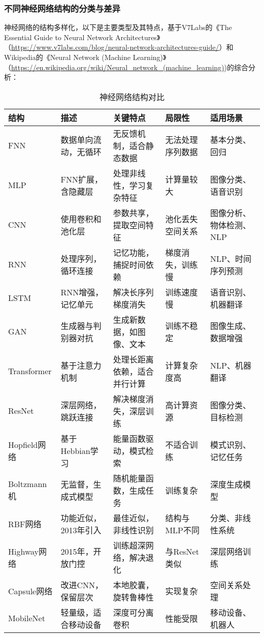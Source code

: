 \documentclass[UTF8]{report}
\theoremstyle{MyLineTheoremStyle} %
\theoremstyle{MyBlockTheoremStyle} %
\theoremstyle{MySubsubsectionStyle} %
\begin{document}
\subsubsection{不同神经网络结构的分类与差异}
神经网络的结构多样化，以下是主要类型及其特点，基于V7Labs的《The Essential Guide to Neural Network Architectures》（\url{https://www.v7labs.com/blog/neural-network-architectures-guide/}）和Wikipedia的《Neural Network (Machine Learning)》（\url{https://en.wikipedia.org/wiki/Neural_network_(machine_learning)})的综合分析：

\begin{table}[h]
\centering
\caption{神经网络结构对比}
\begin{tabular}{l p{3.5cm} p{4cm} p{3cm} p{3cm}}
\toprule
\textbf{结构} & \textbf{描述} & \textbf{关键特点} & \textbf{局限性} & \textbf{适用场景} \\
\midrule
FNN & 数据单向流动，无循环 & 无反馈机制，适合静态数据 & 无法处理序列数据 & 基本分类、回归 \\
MLP & FNN扩展，含隐藏层 & 处理非线性，学习复杂特征 & 计算量较大 & 图像分类、语音识别 \\
CNN & 使用卷积和池化层 & 参数共享，提取空间特征 & 池化丢失空间关系 & 图像分析、物体检测、NLP \\
RNN & 处理序列，循环连接 & 记忆功能，捕捉时间依赖 & 梯度消失，训练慢 & NLP、时间序列预测 \\
LSTM & RNN增强，记忆单元 & 解决长序列梯度消失 & 训练速度慢 & 语音识别、机器翻译 \\
GAN & 生成器与判别器对抗 & 生成新数据，如图像、文本 & 训练不稳定 & 图像生成、数据增强 \\
Transformer & 基于注意力机制 & 处理长距离依赖，适合并行计算 & 计算复杂度高 & NLP、机器翻译 \\
ResNet & 深层网络，跳跃连接 & 解决梯度消失，深层训练 & 高计算资源 & 图像分类、目标检测 \\
Hopfield网络 & 基于Hebbian学习 & 能量函数驱动，模式检索 & 不适合训练 & 模式识别、记忆任务 \\
Boltzmann机 & 无监督，生成式模型 & 随机能量函数，生成任务 & 训练复杂 & 深度生成模型 \\
RBF网络 & 功能近似，2013年引入 & 最佳近似，非线性识别 & 结构与MLP不同 & 分类、非线性系统 \\
Highway网络 & 2015年，开放门控 & 训练超深网络，解决退化 & 与ResNet类似 & 深层网络训练 \\
Capsule网络 & 改进CNN，保留层次 & 本地胶囊，旋转鲁棒性 & 实现复杂 & 空间关系处理 \\
MobileNet & 轻量级，适合移动设备 & 深度可分离卷积 & 性能受限 & 移动设备、机器人 \\
\bottomrule
\end{tabular}
\end{table}
\end{document}
